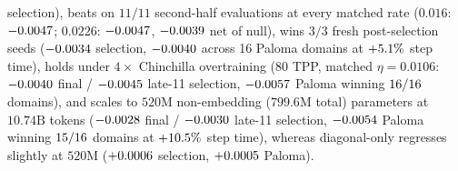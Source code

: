 \begin{enumerate}
  selection),  beats  on $11/11$ second-half
  evaluations at every matched rate ($0.016$: $-0.0047{}$;
  $0.0226$: $-0.0047{}$, $-0.0039{}$
  net of null), wins $3/3$ fresh post-selection seeds
  ($-0.0034{}$ selection, $-0.0040{}$ across
  16 Paloma domains at $+5.1\%$ step time), holds under $4\times$
  Chinchilla overtraining ($80$ TPP, matched $\eta=0.0106$:
  $-0.0040{}$ final / $-0.0045{}$ late-11 selection,
  $-0.0057{}$ Paloma winning $16{}/16$
  domains), and scales to $520\text{M}$ non-embedding ($799.6\text{M}$ total)
  parameters at $10.74\text{B}$ tokens ($-0.0028{}$ final /
  $-0.0030{}$ late-11 selection, $-0.0054{}$ Paloma
  winning $15{}/16$ domains at $+10.5\%$ step
  time), whereas diagonal-only  regresses slightly at $520\text{M}$
  ($+0.0006{}$ selection, $+0.0005{}$ Paloma).
\end{enumerate}
